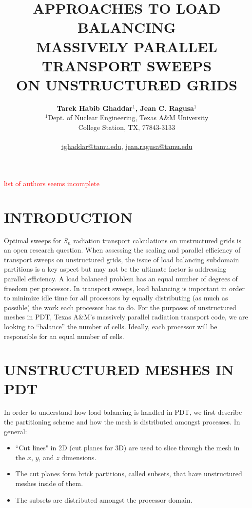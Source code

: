 \documentclass[letterpaper]{mandc2019}
\title{APPROACHES TO LOAD BALANCING \\
MASSIVELY PARALLEL TRANSPORT SWEEPS \\
 ON UNSTRUCTURED GRIDS}
\author{%
  \textbf{Tarek Habib Ghaddar$^1$, Jean C. Ragusa$^1$}\\%
  $^1$Dept. of Nuclear Engineering, Texas  A\&M University \\
  College Station, TX, 77843-3133 \\ 
\\
  \url{tghaddar@tamu.edu}, \url{jean.ragusa@tamu.edu}
}
\newcommand{\jcr}[1]{\textcolor{red}{#1}}
\begin{document}
\maketitle
\justify 

\jcr{list of authors seems incomplete}
\section{INTRODUCTION} 
Optimal sweeps for $S_n$ radiation transport calculations on unstructured grids is an open research question. When assessing the scaling and parallel efficiency of transport sweeps on unstructured grids, the issue of load balancing  subdomain partitions is a key aspect but may not be the ultimate factor is addressing parallel efficiency. A load balanced problem has an equal number of degrees of freedom per processor. In transport sweeps, load balancing is important in order to minimize idle time for all processors by equally distributing (as much as possible) the work each processor has to do.  For the purposes of unstructured meshes in PDT, Texas A\&M's massively parallel radiation transport code, we are looking to ``balance'' the number of cells. Ideally, each processor will be responsible for an equal number of cells. 

\section{UNSTRUCTURED MESHES IN PDT} 
\label{sec:first}

In order to understand how load balancing is handled in PDT, we first describe the partitioning scheme and how the mesh is distributed amongst processes.  In general:
\vspace{-1cm}
\begin{itemize}\itemsep 1pt \parskip 0pt \parsep 0pt
\item ``Cut lines" in 2D (cut planes for 3D) are used to slice through the mesh in the $x$, $y$, and $z$ dimensions.
\item The cut planes form brick partitions, called subsets, that have unstructured meshes inside of them. 
\item The subsets are distributed amongst the processor domain.
\end{itemize}
\vspace{-1cm}
\end{document}
